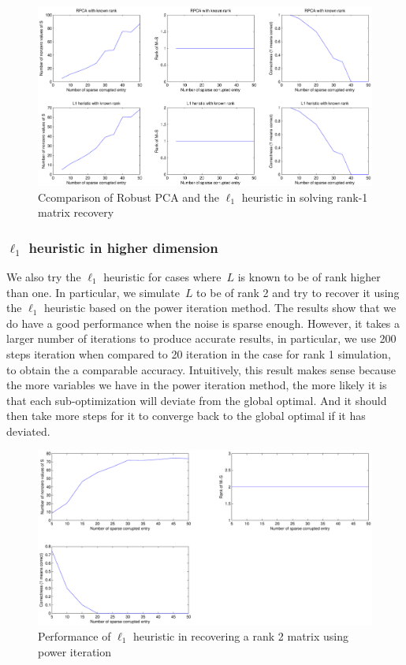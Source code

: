 \begin{figure}[h!]
\label{fig:comparison}
\centering
\includegraphics[width=\textwidth]{../figures/compare.pdf}
\caption{Ccomparison of Robust PCA and the $\ell_1$ heuristic in solving rank-1 matrix recovery}
\end{figure}

\subsubsection{$\ell_{1}$ heuristic in higher dimension}
We also try the $\ell_1$ heuristic for cases where~$L$ is known to be of rank higher than one. In particular, we simulate~$L$ to be of rank 2 and try to recover it using the $\ell_1$ heuristic based on the power iteration method. The results show that we do have a good performance when the noise is sparse enough. However, it takes a larger number of iterations to produce accurate results, in particular, we use 200 steps iteration when compared to 20 iteration in the case for rank 1 simulation, to obtain the a comparable accuracy. Intuitively, this result makes sense because the more variables we have in the power iteration method, the more likely it is that each sub-optimization will deviate from the global optimal. And it should then take more steps for it to converge back to the global optimal if it has deviated.
%
\begin{figure}[h!]
\centering
\includegraphics[width=\textwidth]{../figures/rank2case.pdf}
\caption{Performance of $\ell_1$ heuristic in recovering a rank 2 matrix using power iteration}
\label{fig:rank2}
\end{figure}


